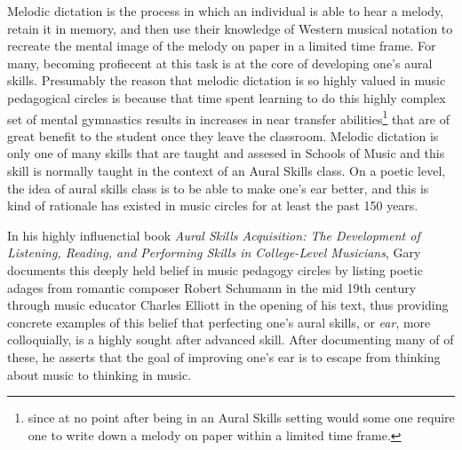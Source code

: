 \documentclass[]{book}
\let\rmarkdownfootnote\footnote%
\def\footnote{\protect\rmarkdownfootnote}
\theoremstyle{definition}
\theoremstyle{definition}
\theoremstyle{definition}
\theoremstyle{remark}
\begin{document}
Melodic dictation is the process in which an individual is able to hear
a melody, retain it in memory, and then use their knowledge of Western
musical notation to recreate the mental image of the melody on paper in
a limited time frame. For many, becoming profiecent at this task is at
the core of developing one's aural skills. Presumably the reason that
melodic dictation is so highly valued in music pedagogical circles is
because that time spent learning to do this highly complex set of mental
gymnastics results in increases in near transfer abilities\footnote{since
  at no point after being in an Aural Skills setting would some one
  require one to write down a melody on paper within a limited time
  frame.} that are of great benefit to the student once they leave the
classroom. Melodic dictation is only one of many skills that are taught
and assesed in Schools of Music and this skill is normally taught in the
context of an Aural Skills class. On a poetic level, the idea of aural
skills class is to be able to make one's ear better, and this is kind of
rationale has existed in music circles for at least the past 150 years.

In his highly influenctial book \emph{Aural Skills Acquisition: The
Development of Listening, Reading, and Performing Skills in
College-Level Musicians}, Gary
\citet{karpinskiAuralSkillsAcquisition2000} documents this deeply held
belief in music pedagogy circles by listing poetic adages from romantic
composer Robert Schumann in the mid 19th century through music educator
Charles Elliott in the opening of his text, thus providing concrete
examples of this belief that perfecting one's aural skills, or
\emph{ear}, more colloquially, is a highly sought after advanced skill.
After documenting many of of these, he asserts that the goal of
improving one's ear is to escape from thinking about music to thinking
in music.
\end{document}
